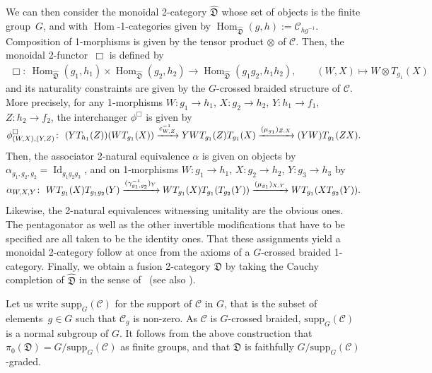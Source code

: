 \documentclass[pdftex]{sigma}
\numberwithin{equation}{section}
\begin{document}
\begin{Construction}
We can then consider the monoidal 2-category $\widehat{\mathfrak{D}}$ whose set of objects is the finite group~$G$, and with $\operatorname{Hom}$-1-categories given by $\operatorname{Hom}_{\widehat{\mathfrak{D}}}(g,h):=\mathcal{C}_{hg^{-1}}$.
 Composition of 1-morphisms is given by the tensor product $\otimes$ of $\mathcal{C}$. Then, the monoidal 2-functor~$\Box$ is defined by
 \begin{gather*}
\Box\colon\ \operatorname{Hom}_{\widehat{\mathfrak{D}}}(g_1,h_1)\times \operatorname{Hom}_{\widehat{\mathfrak{D}}}(g_2,h_2)\rightarrow \operatorname{Hom}_{\widehat{\mathfrak{D}}}(g_1g_2,h_1h_2),\qquad (W,X) \mapsto W\otimes T_{g_1}(X)
\end{gather*}
and its naturality constraints are given by the $G$-crossed braided structure of $\mathcal{C}$. More precisely, for any 1-morphisms $W\colon g_1\rightarrow h_1$, $X\colon g_2\rightarrow h_2$, $Y\colon h_1\rightarrow f_1$, $Z\colon h_2\rightarrow f_2$, the interchanger $\phi^{\Box}$ is given by
\begin{gather*}
\smash{\phi^{\Box}_{(W,X),(Y,Z)}\colon\ (YT_{h_1}(Z))(WT_{g_1}(X))\xrightarrow{c^{-1}_{W,Z}}YWT_{g_1}(Z)T_{g_1}(X)\xrightarrow{(\mu_{g_1})_{Z,X}}(YW)T_{g_1}(ZX)}.
\end{gather*}
Then, the associator 2-natural equivalence $\alpha$ is given on objects by $\alpha_{g_1,g_2,g_2}=\operatorname{Id}_{g_1g_2g_3}$, and on 1-morphisms $W\colon g_1\rightarrow h_1$, $X\colon g_2\rightarrow h_2$, $Y\colon g_3\rightarrow h_3$ by
\begin{gather*}
\smash{\alpha_{W,X,Y}\colon\ WT_{g_1}(X)T_{g_1g_2}(Y)\xrightarrow{(\gamma^{-1}_{g_1,g_2})_Y}WT_{g_1}(X)T_{g_1}(T_{g_2}(Y))\xrightarrow{(\mu_{g_1})_{X,Y}}WT_{g_1}(XT_{g_2}(Y))}.
\end{gather*}
Likewise, the 2-natural equivalences witnessing unitality are the obvious ones. The pentagonator as well as the other invertible modifications that have to be specified are all taken to be the identity ones. That these assignments yield a monoidal 2-category follow at once from the axioms of a $G$-crossed braided 1-category. Finally, we obtain a fusion 2-category $\mathfrak{D}$ by taking the Cauchy completion of $\widehat{\mathfrak{D}}$ in the sense of~\cite{GJF} (see also \cite{D1,DR}).
\end{Construction}

\begin{Remark}
Let us write $\mathrm{supp}_G(\mathcal{C})$ for the support of $\mathcal{C}$ in $G$, that is the subset of elements~${g\in G}$ such that $\mathcal{C}_g$ is non-zero. As $\mathcal{C}$ is $G$-crossed braided, $\mathrm{supp}_G(\mathcal{C})$ is a normal subgroup of $G$. It follows from the above construction that $\pi_0(\mathfrak{D})=G/\mathrm{supp}_G(\mathcal{C})$ as finite groups, and that $\mathfrak{D}$ is faithfully $G/\mathrm{supp}_G(\mathcal{C})$-graded.
\end{Remark}
\end{document}
